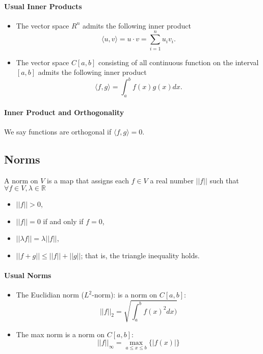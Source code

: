 \documentclass[12pt, letterpaper]{article}
\begin{document}
    \paragraph{Usual Inner Products}
    \begin{itemize}
        \item The vector space \(R^n\) admits the following inner product
        \[ 
            \langle u, v \rangle = u\cdot v = \sum_{i=1}^n u_i v_i.
        \]
        \item The vector space \(C[a, b]\) consisting of all continuous
        function on the interval \([a, b]\) admits the following inner product
        \[
            \langle f, g \rangle = \int_{a}^{b} f(x) g(x) dx.
        \]
    \end{itemize}

    \paragraph{Inner Product and Orthogonality}
    We say functions are orthogonal if \(\langle f, g\rangle = 0\).
    
    \subsection{Norms}
    A norm on \(V\) is a map that assigns each \(f\in V\) a real number
    \(||f||\) such that \(\forall f \in V, \lambda \in \mathbb{R}\)
    \begin{itemize}
        \item \(||f|| > 0\),
        \item \(||f|| = 0\) if and only if \(f = 0\),
        \item \(||\lambda f|| = \lambda ||f||\),
        \item \(||f + g|| \leq ||f|| + ||g||\); that is, the triangle inequality holds.
    \end{itemize}
    
    \paragraph{Usual Norms}
    \begin{itemize}
        \item The Euclidian norm (\(L^2\)-norm): is a norm on \(C[a, b]\):
        \[||f||_2 = \sqrt{\int_a^b f(x)^2 dx)}\]
        \item The max norm is a norm on \(C[a, b]\):
        \[||f||_\infty = \max_{a \leq x \leq b} \{|f(x)|\}\]
    \end{itemize}
    
\end{document}
